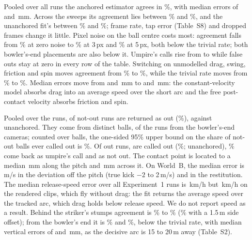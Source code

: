 \documentclass[journal]{IEEEtran}
\begin{document}
Pooled over all runs the anchored estimator agrees in \GeoAgreeAll\%, with median errors of \GeoMedYAll{}
and \GeoMedZAll\,mm. Across the sweeps its agreement lies between \SweepAgreeMin\% and \SweepAgreeMax\%, and
the unanchored fit's between \SweepAgreeMinUnanch\% and \SweepAgreeMaxUnanch\%; frame rate, tap error
(Table~S8) and dropped frames change it little. Pixel noise on the ball centre costs most: agreement falls
from \NoiseZeroAgree\% at zero noise to \NoiseThreeAgree\% at 3\,px and \NoiseFiveAgree\% at 5\,px,
both below the trivial rate; both bowler's-end placements are also below it. Umpire's calls rise
from \NoiseZeroUmp{} to \NoiseFiveUmp{} while false outs stay at zero in every row of the table. Switching on unmodelled
drag, swing, friction and spin moves agreement from \PhysOffAgree\% to \PhysOnAgree\%, while the trivial
rate moves from \PhysOffAlwaysNotOutPct\% to \PhysOnAlwaysNotOutPct\%. Median errors move from
\PhysOffMedY{} and \PhysOffMedZ\,mm to \PhysOnMedY{} and \PhysOnMedZ\,mm: the constant-velocity model absorbs
drag into an average speed over the short arc and the free post-contact velocity absorbs friction and spin.

Pooled over the \GeoRuns{} runs, \GeoFalseOut{} of \GeoNotOut{} not-out runs are returned as out
(\GeoFalseOutPct\%), against \GeoFalseOutUnanch{} unanchored. They come from \GeoFalseOutDistinct{} distinct
balls, \GeoFalseOutBowler{} of the runs from the bowler's-end cameras; counted over balls, the one-sided
95\% upper bound on the share of not-out balls ever called out is \GeoFalseOutUpperBall\%. Of \GeoOut{}
out runs, \GeoOutCalledOut{} are called out (\GeoOutCalledOutPct\%; \GeoOutCalledOutUnanch{} unanchored),
\GeoOutToUmpPct\% come back as umpire's call and \GeoMissedOut{} as not out. The contact point is located to a median
\GeoMedContactX\,mm along the pitch and \GeoMedContactY\,mm across it. On World~B, the median error is
\GeoMedDevErr\,m/s in the deviation off the pitch (true kick $-2$ to 2\,m/s) and
\GeoMedRestErr{} in the restitution. The median release-speed error over all Experiment~1 runs is \GeoMedSpeedErr\,km/h but \EteMedSpeedErr\,km/h on
the rendered clips, which fly without drag: the fit returns the average speed over the tracked arc, which drag
holds below release speed. We do not report speed as a result. Behind the striker's stumps agreement
is \CamStrikerMinAgree\% to \CamStrikerMaxAgree\% (\CamStrikerSideAgree\% with a 1.5\,m side offset); from
the bowler's end it is \CamBowlerRefAgree\% and \CamBowlerSideAgree\%, below the trivial rate, with median
vertical errors of \CamBowlerRefMedZ{} and \CamBowlerSideMedZ\,mm,
as the decisive arc is 15 to 20\,m away (Table~S2).
\end{document}
